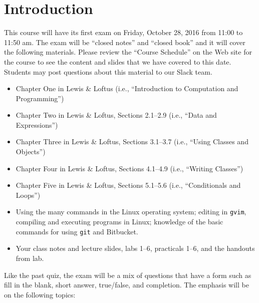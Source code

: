 


\section*{Introduction}

This course will have its first exam on Friday, October 28, 2016 from 11:00 to 11:50 am. The exam will be ``closed
notes'' and ``closed book'' and it will cover the following materials. Please review the ``Course Schedule'' on the Web
site for the course to see the content and slides that we have covered to this date. Students may post questions about
this material to our Slack team.

\begin{itemize}

  \itemsep 0in

  \item Chapter One in Lewis \& Loftus (i.e., ``Introduction to Computation and Programming'')

  \item Chapter Two in Lewis \& Loftus, Sections 2.1--2.9 (i.e., ``Data and Expressions'')

  \item Chapter Three in Lewis \& Loftus, Sections 3.1--3.7 (i.e., ``Using Classes and Objects'')

  \item Chapter Four in Lewis \& Loftus, Sections 4.1--4.9 (i.e., ``Writing Classes'')

  \item Chapter Five in Lewis \& Loftus, Sections 5.1--5.6 (i.e., ``Conditionals and Loops'')

  \item Using the many commands in the Linux operating system; editing in {\tt gvim}, compiling and executing
    programs in Linux; knowledge of the basic commands for using {\tt git} and Bitbucket.

  \item Your class notes and lecture slides, labs 1--6, practicals 1--6, and the handouts from lab.

\end{itemize}

\noindent Like the past quiz, the exam will be a mix of questions that have a form such as fill in the blank, short answer, true/false, and
completion. The emphasis will be on the following topics:

